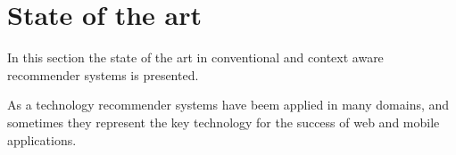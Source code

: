 \chapter{State of the art} \label{stateoftheart}



In this section the state of the art in conventional and
context aware recommender systems is presented. 

As a technology recommender systems have beem applied 
in many domains, and sometimes they represent the  key
technology for the success of web and mobile applications.

% 


